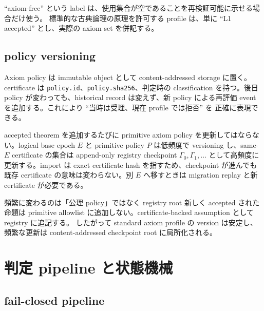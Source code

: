 \documentclass[a4paper,11pt]{ltjsarticle}
\newcommand{\code}[1]{\texttt{#1}}
\begin{document}
``axiom-free'' という label は、使用集合が空であることを再検証可能に示せる場合だけ使う。
標準的な古典論理の原理を許可する profile は、単に ``L1 accepted'' とし、実際の axiom set を併記する。

\subsection{policy versioning}

Axiom policy は immutable object として content-addressed storage に置く。certificate は
\code{policy.id}、\code{policy.sha256}、判定時の classification を持つ。後日 policy が変わっても、historical
record は変えず、新 policy による再評価 event を追加する。これにより ``当時は受理、現在 profile では拒否'' を
正確に表現できる。

accepted theorem を追加するたびに primitive axiom policy を更新してはならない。logical base epoch $E$ と primitive
policy $P$ は低頻度で versioning し、same-$E$ certificate の集合は append-only registry checkpoint
$\Gamma_0,\Gamma_1,\ldots$ として高頻度に更新する。import は exact certificate hash を指すため、checkpoint が進んでも
既存 certificate の意味は変わらない。別 $E$ へ移すときは migration replay と新 certificate が必要である。

\begin{decisionbox}{頻繁に変わるのは「公理 policy」ではなく registry root}
新しく accepted された命題は primitive allowlist に追加しない。certificate-backed assumption として registry に追記する。
したがって standard axiom profile の version は安定し、頻繁な更新は content-addressed checkpoint root に局所化される。
\end{decisionbox}

\section{判定 pipeline と状態機械}

\subsection{fail-closed pipeline}
\end{document}
